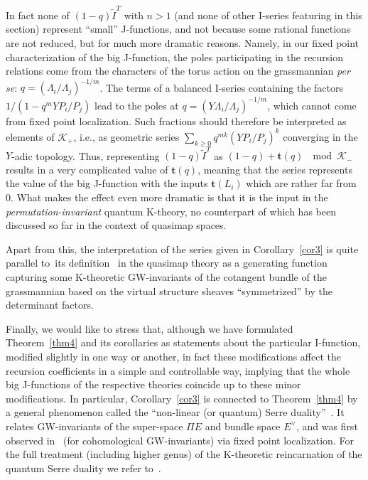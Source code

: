 \documentclass[pdftex]{sigma}
\numberwithin{equation}{section}
\def\K{\mathcal K}
\def\tilde{\widetilde}
\def\t{{\mathbf t}}
\begin{document}
In fact none of $(1-q) \tilde{I}^T$ with $n>1$ (and none of other I-series featuring in this section) represent ``small'' J-functions, and not because some rational functions are not reduced, but for much more dramatic reasons. Namely, in our fixed point characterization of the big J-function, the poles participating in the recursion relations come from the characters of the torus action on the grassmannian {\em per se}: $q=(\Lambda_i/\Lambda_j)^{-1/m}$. The terms of a balanced I-series containing the factors $1/(1-q^mYP_i/P_j)$ lead to the poles at $q=(Y\Lambda_i/\Lambda_j)^{-1/m}$, which cannot come from fixed point localization. Such fractions should therefore be interpreted as elements of $\K_{+}$, i.e., as geometric series $\sum_{k\geq 0}q^{mk}(YP_i/P_j)^k$ converging in the $Y$-adic topology. Thus, representing $(1-q) \tilde{I}^T$ as $(1-q)+\t(q) \ \mod \K_{-}$ results in a very complicated value of $\t(q)$, meaning that the series represents the value of the big J-function with the inputs $\t(L_i)$ which are rather far from~$0$. What makes the effect even more dramatic is that it is the input in the {\em permutation-invariant} quantum K-theory, no counterpart of which has been discussed so far in the context of quasimap spaces.

Apart from this, the interpretation of the series given in Corollary~\ref{cor3} is quite parallel to~its definition~\cite{KPSZ, Ok, PSZ} in the quasimap theory as a generating function capturing some K-theoretic GW-invariants of the cotangent bundle of the grassmannian based on the virtual structure sheaves ``symmetrized'' by the determinant factors.

Finally, we would like to stress that, although we have formulated Theorem~\ref{thm4} and its corollaries as statements about the particular I-function, modified slightly in one way or another, in fact these modifications affect the recursion coefficients in a simple and controllable way, implying that the whole big J-functions of the respective theories coincide up to these minor modifications. In particular, Corollary~\ref{cor3} is connected to Theorem~\ref{thm4} by a general phenomenon called the ``non-linear (or quantum) Serre duality''~\cite{Coates-Givental}. It relates GW-invariants of the super-space $\Pi E$ and bundle space $E^{\vee}$, and was first observed in~\cite{Givental:EGWI} (for cohomological GW-invariants) via fixed point localization. For the full treatment (including higher genus) of the K-theoretic reincarnation of the quantum Serre duality we refer to~\cite{Yan}.
\end{document}
